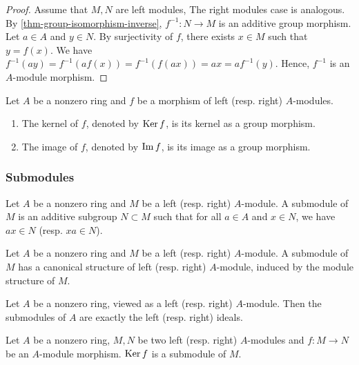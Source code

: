 \documentclass[12pt]{report}
\begin{document}
\begin{proof}
    Assume that $M, N$ are left modules, The right modules case is analogous. By \ref{thm-group-isomorphism-inverse}, $f^{-1} \colon N \to M$ is an additive group morphism. Let $a \in A$ and $y \in N$. By surjectivity of $f$, there exists $x \in M$ such that $y = f(x)$. We have $f^{-1}(a y) = f^{-1}(a f(x)) = f^{-1}(f(a x)) = a x = a f^{-1}(y)$. Hence, $f^{-1}$ is an $A$-module morphism.
\end{proof}

\begin{definition} \label{def-module-morphism-kernel-image}
    Let $A$ be a nonzero ring and $f$ be a morphism of left (resp. right) $A$-modules.
    \begin{enumerate}[label=(\roman*)]
        \item The kernel of $f$, denoted by $\operatorname{Ker} f$, is its kernel as a group morphism.
        \item The image of $f$, denoted by $\operatorname{Im} f$, is its image as a group morphism.
    \end{enumerate}
\end{definition}

\subsubsection{Submodules}

\begin{definition} \label{def-submodule}
    Let $A$ be a nonzero ring and $M$ be a left (resp. right) $A$-module. A submodule of $M$ is an additive subgroup $N \subset M$ such that for all $a \in A$ and $x \in N$, we have $ax \in N$ (resp. $xa \in N$).
\end{definition}

\begin{proposition} \label{prop-submodule-canonical-structure}
    Let $A$ be a nonzero ring and $M$ be a left (resp. right) $A$-module. A submodule of $M$ has a canonical structure of left (resp. right) $A$-module, induced by the module structure of $M$.
\end{proposition}

\begin{remark}
    Let $A$ be a nonzero ring, viewed as a left (resp. right) $A$-module. Then the submodules of $A$ are exactly the left (resp. right) ideals.
\end{remark}

\begin{proposition} \label{prop-module-morphism-kernel-submodule}
    Let $A$ be a nonzero ring, $M, N$ be two left (resp. right) $A$-modules and $f \colon M \to N$ be an $A$-module morphism. $\operatorname{Ker} f$ is a submodule of $M$.
\end{proposition}
\end{document}
